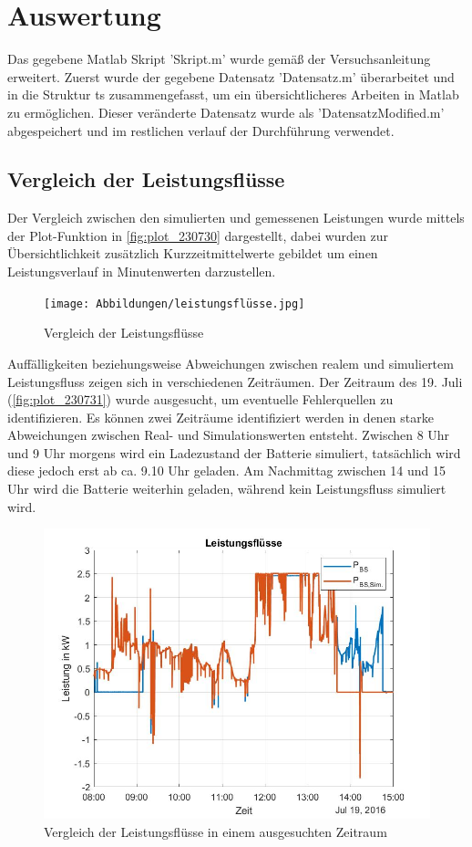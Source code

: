 \newpage
\section{Auswertung}
Das gegebene Matlab Skript 'Skript.m' wurde gemäß der Versuchsanleitung \cite[S. 11]{Laboranleitung} erweitert.
Zuerst wurde der gegebene Datensatz 'Datensatz.m' überarbeitet und in die Struktur ts zusammengefasst, um ein übersichtlicheres Arbeiten in Matlab zu ermöglichen.
Dieser veränderte Datensatz wurde als 'DatensatzModified.m' abgespeichert und im restlichen verlauf der Durchführung verwendet.


\subsection{Vergleich der Leistungsflüsse}
Der Vergleich zwischen den simulierten und gemessenen Leistungen wurde mittels der Plot-Funktion in \autoref{fig:plot_230730} dargestellt,
dabei wurden zur Übersichtlichkeit zusätzlich Kurzzeitmittelwerte gebildet um einen Leistungsverlauf in Minutenwerten darzustellen.

\begin{figure}[H]
    \centering
    \texttt{[image: Abbildungen/leistungsflüsse.jpg]}
    \caption{Vergleich der Leistungsflüsse}
    \label{fig:plot_230730}
\end{figure}

\newpage
Auffälligkeiten beziehungsweise Abweichungen zwischen realem und simuliertem Leistungsfluss zeigen sich in verschiedenen Zeiträumen.
Der Zeitraum des 19. Juli (\autoref{fig:plot_230731}) wurde ausgesucht, um eventuelle Fehlerquellen zu identifizieren. Es können zwei Zeiträume identifiziert werden in denen starke Abweichungen zwischen Real- und Simulationswerten entsteht. Zwischen 8 Uhr und 9 Uhr morgens wird ein Ladezustand der Batterie simuliert, tatsächlich wird diese jedoch erst ab ca. 9.10 Uhr geladen. Am Nachmittag zwischen 14 und 15 Uhr wird die Batterie weiterhin geladen, während kein Leistungsfluss simuliert wird.


\begin{figure}[H]
    \centering
    \includegraphics[width=1\textwidth]{Abbildungen/8.15.jpg}
    \caption{Vergleich der Leistungsflüsse in einem ausgesuchten Zeitraum}
    \label{fig:plot_230731}
\end{figure}

